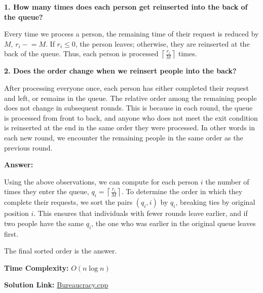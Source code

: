 \documentclass{article}
\begin{document}
\vspace{1em}

\noindent  \textbf{1. How many times does each person get reinserted into the back of the queue?}

\noindent Every time we process a person, the remaining time of their request is reduced by \( M \), \( r_i \mathrel{-}= M \).  
If \( r_i \leq 0 \), the person leaves; otherwise, they are reinserted at the back of the queue.  
Thus, each person is processed \( \left\lceil \frac{r_i}{M} \right\rceil \) times.

\vspace{1em}

\noindent \textbf{2. Does the order change when we reinsert people into the back?}

\noindent After processing everyone once, each person has either completed their request and left, or remains in the queue.  
The relative order among the remaining people does not change in subsequent rounds. This is because in each round, the queue is processed from front to back, and anyone who does not meet the exit condition is reinserted at the end in the same order they were processed.  
In other words in each new round, we encounter the remaining people in the same order as the previous round.

\vspace{2em}

\noindent \textbf{Answer:}

\noindent Using the above observations, we can compute for each person \( i \) the number of times they enter the queue, \( q_i = \left\lceil \frac{r_i}{M} \right\rceil \).  
To determine the order in which they complete their requests, we sort the pairs \( (q_i, i) \) by \( q_i \), breaking ties by original position \( i \).  
This ensures that individuals with fewer rounds leave earlier, and if two people have the same \( q_i \), the one who was earlier in the original queue leaves first.

\noindent The final sorted order is the answer.

\vspace{1em}
\noindent \textbf{Time Complexity:}
$O(n\log n)$

\vspace{1em}
\noindent \textbf{Solution Link:} 
\href{https://github.com/StathisKons/GRCPC-2024-Editorial-Implementations/blob/main/Sample%20Implementations/B.%20Bureaucracy.cpp}{Bureaucracy.cpp}

\newpage
\vspace{5em}
\end{document}
